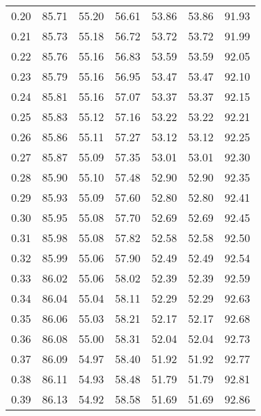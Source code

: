 \begin{tabular}{|c|c|c|c|c|c|c|}
      0.20 &     85.71 &     55.20 &      56.61 &   53.86 &      53.86 &         91.93 \\
      0.21 &     85.73 &     55.18 &      56.72 &   53.72 &      53.72 &         91.99 \\
      0.22 &     85.76 &     55.16 &      56.83 &   53.59 &      53.59 &         92.05 \\
      0.23 &     85.79 &     55.16 &      56.95 &   53.47 &      53.47 &         92.10 \\
      0.24 &     85.81 &     55.16 &      57.07 &   53.37 &      53.37 &         92.15 \\
      0.25 &     85.83 &     55.12 &      57.16 &   53.22 &      53.22 &         92.21 \\
      0.26 &     85.86 &     55.11 &      57.27 &   53.12 &      53.12 &         92.25 \\
      0.27 &     85.87 &     55.09 &      57.35 &   53.01 &      53.01 &         92.30 \\
      0.28 &     85.90 &     55.10 &      57.48 &   52.90 &      52.90 &         92.35 \\
      0.29 &     85.93 &     55.09 &      57.60 &   52.80 &      52.80 &         92.41 \\
      0.30 &     85.95 &     55.08 &      57.70 &   52.69 &      52.69 &         92.45 \\
      0.31 &     85.98 &     55.08 &      57.82 &   52.58 &      52.58 &         92.50 \\
      0.32 &     85.99 &     55.06 &      57.90 &   52.49 &      52.49 &         92.54 \\
      0.33 &     86.02 &     55.06 &      58.02 &   52.39 &      52.39 &         92.59 \\
      0.34 &     86.04 &     55.04 &      58.11 &   52.29 &      52.29 &         92.63 \\
      0.35 &     86.06 &     55.03 &      58.21 &   52.17 &      52.17 &         92.68 \\
      0.36 &     86.08 &     55.00 &      58.31 &   52.04 &      52.04 &         92.73 \\
      0.37 &     86.09 &     54.97 &      58.40 &   51.92 &      51.92 &         92.77 \\
      0.38 &     86.11 &     54.93 &      58.48 &   51.79 &      51.79 &         92.81 \\
      0.39 &     86.13 &     54.92 &      58.58 &   51.69 &      51.69 &         92.86 \\

\end{tabular}

